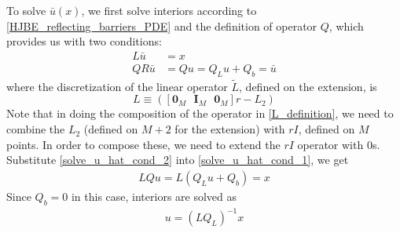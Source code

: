 \documentclass[11pt]{article}
\begin{document}
To solve $\bar{u}(x)$, we first solve interiors according to \cref{HJBE_reflecting_barriers_PDE} and the definition of operator $Q$, which provides us with two conditions:
\begin{align}
L \bar{u} &= x\label{solve_u_hat_cond_1}\\
Q R\bar{u} &= Q u = Q_L u+Q_b = \bar{u}\label{solve_u_hat_cond_2}
\end{align}
where the discretization of the linear operator $\tilde{L}$, defined on the extension, is
\begin{equation}
L \equiv ([\mathbf{0}_{M} \text{ } \mathbf{I}_{M} \text{ } \mathbf{0}_{M}] r - L_2)
\label{L_definition}
\end{equation}
Note that in doing the composition of the operator in \cref{L_definition}, we need to combine the $L_2$ (defined on $M+2$ for the extension) with $r I$, defined on $M$ points.  In order to compose these, we need to extend the $r I$ operator with $0$s.
Substitute \cref{solve_u_hat_cond_2} into \cref{solve_u_hat_cond_1}, we get
\begin{align}
L Q u = L (Q_L u+Q_b) = x
\end{align}
Since $Q_b = 0$ in this case, interiors are solved as
\begin{align}
u = (L Q_L)^{-1}x
\end{align}
\end{document}
